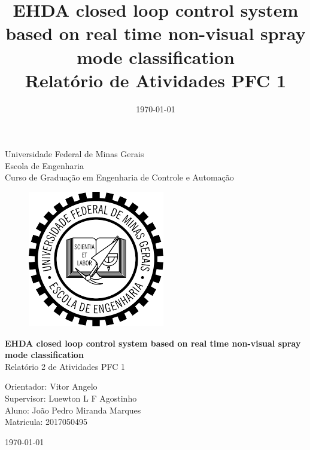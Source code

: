\begin{titlepage}
    \begin{center}
           
    {\large Universidade Federal de Minas Gerais\\
    Escola de Engenharia \\
    Curso de Graduação em Engenharia de Controle e Automação\\}
    \vfill

    \begin{figure}[h]
        \centering
        \includegraphics[scale=0.5]{images/brasao_ufmg.png}
    \end{figure}
    \vspace{2cm}


    {\bf\Large EHDA closed loop control system based on real time non-visual spray mode classification\\}
    \vspace{1cm} 
    {\Large Relatório 2 de Atividades PFC 1}
    \vspace{2cm}  
    
    {\large Orientador: Vitor Angelo\\
            Supervisor: Luewton L F Agostinho}\\

    
    {\large Aluno: João Pedro Miranda Marques \\
    Matricula: 2017050495}
    \vspace{2cm}  

    \today
    \vspace{2cm}  
       

    \large \date{\today}
    \end{center}
    
    \end{titlepage}
    
    \newpage
    \clearpage
    \thispagestyle{empty}
    
    \cleardoublepage


\title{
    EHDA closed loop control system based on real time non-visual spray mode classification \\
    \large Relatório de Atividades PFC 1}

